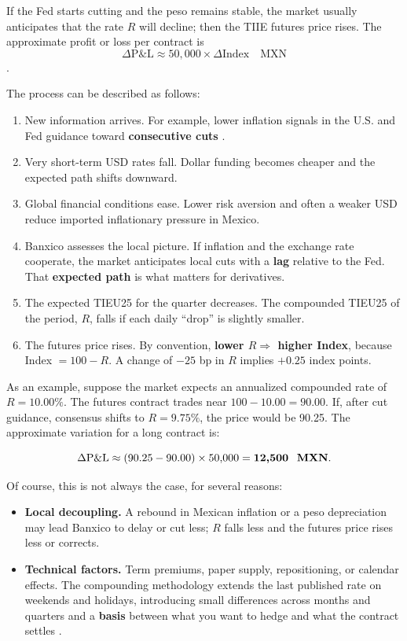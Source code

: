 \documentclass[11pt,a4paper]{article} %
\begin{document}
If the Fed starts cutting and the peso remains stable, the market usually anticipates that the rate $R$ will decline; then the TIIE futures price rises. The approximate profit or loss per contract is 
\[
\Delta \text{P\&L} \approx 50{,}000 \times \Delta \text{Index} \quad \text{MXN}
\]
\citep{banxico2023,cme2025a,cme2025b,reuters2025a}. 

The process can be described as follows:

\begin{enumerate}
    \item New information arrives. For example, lower inflation signals in the U.S. and Fed guidance toward \textbf{consecutive cuts} \citep{reuters2025}.
    \item Very short-term USD rates fall. Dollar funding becomes cheaper and the expected path shifts downward.
    \item Global financial conditions ease. Lower risk aversion and often a weaker USD reduce imported inflationary pressure in Mexico.
    \item Banxico assesses the local picture. If inflation and the exchange rate cooperate, the market anticipates local cuts with a \textbf{lag} relative to the Fed. That \textbf{expected path} is what matters for derivatives.
    \item The expected TIEU25 for the quarter decreases. The compounded TIEU25 of the period, $R$, falls if each daily ``drop'' is slightly smaller.
    \item The futures price rises. By convention, \textbf{lower $R \Rightarrow$ higher Index}, because Index $= 100 - R$. A change of $-25$ bp in $R$ implies $+\!0.25$ index points.
\end{enumerate}

As an example, suppose the market expects an annualized compounded rate of $R = 10.00\%$. The futures contract trades near $100 - 10.00 = 90.00$. If, after cut guidance, consensus shifts to $R = 9.75\%$, the price would be 90.25. The approximate variation for a long contract is:

\[
\Delta \text{P\&L} \approx (90.25 - 90.00)\times 50{,}000 = \textbf{12{,}500 \ \text{MXN}}.
\]

Of course, this is not always the case, for several reasons:

\begin{itemize}
    \item \textbf{Local decoupling.} A rebound in Mexican inflation or a peso depreciation may lead Banxico to delay or cut less; $R$ falls less and the futures price rises less or corrects.
    \item \textbf{Technical factors.} Term premiums, paper supply, repositioning, or calendar effects. The compounding methodology extends the last published rate on weekends and holidays, introducing small differences across months and quarters and a \textbf{basis} between what you want to hedge and what the contract settles \citep{cme2025a,cme2025b}.
\end{itemize}
\end{document}
